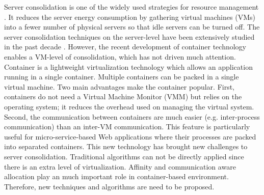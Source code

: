  

Server consolidation \cite{Zhang:2010vo} is one of the widely used strategies 
for resource management \cite{marinescu2013cloud}.
It reduces the server energy consumption by gathering virtual machines (VMs) into a fewer 
number of physical servers so that idle servers can be turned off. 
The server consolidation techniques on the server-level
have been extensively studied in the past decade \cite{}. 
However, the recent development of container technology enables a VM-level of consolidation, which 
has not driven much attention. 
Container is a lightweight virtualization
technology which allows an application running in a single container. 
Multiple containers can be packed in a single virtual machine. 
Two main advantages make the container popular. 
First, containers do not need a Virtual Machine Monitor (VMM) but relies on the operating system; 
it reduces the overhead used on managing the virtual system. 
Second, the communication \cite{} between containers are much 
easier (e.g. inter-process communication) than an inter-VM communication. This feature is 
particularly useful for micro-service-based Web applications where their processes are packed
into separated containers.
This new technology has brought new challenges to server consolidation. 
Traditional algorithms can not be directly applied since there is an extra level
of virtualization. Affinity and communication aware allocation play an much important role 
in container-based environment. Therefore, new techniques and algorithms are need to be proposed. 

